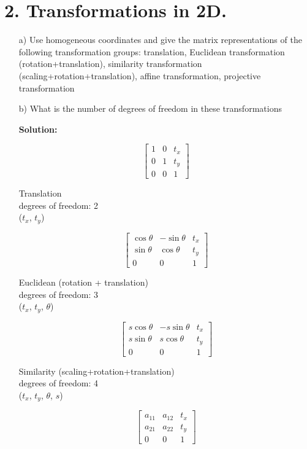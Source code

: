 \documentclass[a4paper,12pt]{article}
\begin{document}
\section*{2. Transformations in 2D.}
\begin{itemize}
\item[a)]  Use homogeneous coordinates and give the matrix representations of the following
transformation groups: translation, Euclidean transformation (rotation+translation),
similarity transformation (scaling+rotation+translation), affine transformation, projective
transformation

\item[b)] What is the number of degrees of freedom in these transformations

\textbf{Solution:}
\begin{center} 

	$$
	\begin{bmatrix} 
		1&0&t_x\\
		0&1&t_y\\
		0&0&1
	\end{bmatrix}$$
	
Translation \\degrees of freedom: 2 \\($t_x$, $t_y$)

	$$
	\begin{bmatrix} 
		\cos \theta & - \sin \theta &t_x\\
		\sin \theta & \cos \theta &t_y\\
		0&0&1
	\end{bmatrix}$$
	
Euclidean (rotation + translation) \\degrees of freedom: 3 \\($t_x$, $t_y$, $\theta$)

	$$
	\begin{bmatrix} 
		s\cos \theta & - s\sin \theta &t_x\\
		s\sin \theta & s\cos \theta &t_y\\
		0&0&1
	\end{bmatrix}$$
	
Similarity (scaling+rotation+translation) \\degrees of freedom: 4 \\($t_x$, $t_y$, $\theta$, $s$)

	$$
	\begin{bmatrix} 
		a_{11}&a_{12}&t_x\\
		a_{21}&a_{22}&t_y\\
		0&0&1
	\end{bmatrix}$$
	

\end{center}
\end{itemize}
\end{document}

